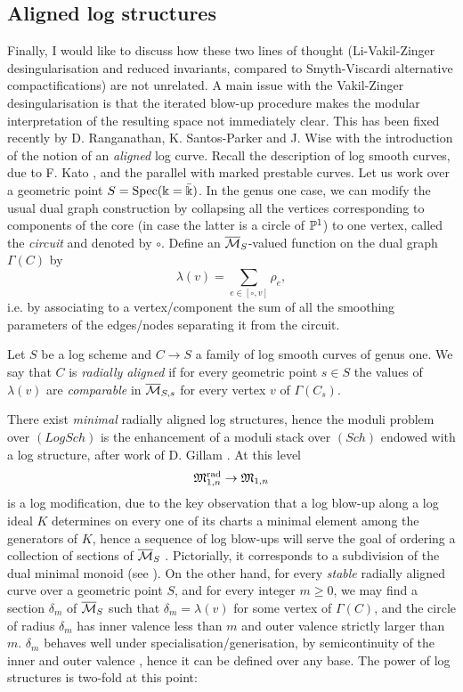 \subsection{Aligned log structures} Finally, I would like to discuss how these two lines of thought (Li-Vakil-Zinger desingularisation and reduced invariants, compared to Smyth-Viscardi alternative compactifications) are not unrelated. A main issue with the Vakil-Zinger desingularisation is that the iterated blow-up procedure makes the modular interpretation of the resulting space not immediately clear. This has been fixed recently by D. Ranganathan, K. Santos-Parker and J. Wise with the introduction of the notion of an \emph{aligned} log curve. Recall the description of log smooth curves, due to F. Kato \cite{KatoF}, and the parallel with marked prestable curves. Let us work over a geometric point $S=\operatorname{Spec}(\Bbbk=\bar{\Bbbk})$. In the genus one case, we can modify the usual dual graph construction by collapsing all the vertices corresponding to components of the core (in case the latter is a circle of $\mathbb P^1$) to one vertex, called the \emph{circuit} and denoted by $\circ$. Define an $\overline{\mathcal{M}}_S$-valued function on the dual graph $\Gamma(C)$ by \[\lambda(v)=\sum_{e\in[\circ,v]}\rho_e,\] i.e. by associating to a vertex/component the sum of all the smoothing parameters of the edges/nodes separating it from the circuit.
\begin{dfn}
 Let $S$ be a log scheme and $C\to S$ a family of log smooth curves of genus one. We say that $C$ is \emph{radially aligned} if for every geometric point $s\in S$ the values of $\lambda(v)$ are \emph{comparable} in $\overline{\mathcal{M}}_{S,s}$ for every vertex $v$ of $\Gamma(C_s)$.
\end{dfn}
There exist \emph{minimal} radially aligned log structures, hence the moduli problem over $(LogSch)$ is the enhancement of a moduli stack over $(Sch)$ endowed with a log structure, after work of D. Gillam \cite{Gillam}. At this level
\[\mathfrak M^{\mathrm{rad}}_{1,n}\rightarrow\mathfrak M_{1,n}\]
is a log modification, due to the key observation that a log blow-up along a log ideal $K$ determines on every one of its charts a minimal element among the generators of $K$, hence a sequence of log blow-ups will serve the goal of ordering a collection of sections of $\overline{\mathcal{M}}_S$ \cite[Lemma 3.36]{Kelithesis}. Pictorially, it corresponds to a subdivision of the dual minimal monoid (see \cite[\S 3.3-3.4]{RSPW}). On the other hand, for every \emph{stable} radially aligned curve over a geometric point $S$, and for every integer $m\geq0$, we may find a section $\delta_m$ of $\overline{\mathcal{M}}_S$ such that $\delta_m=\lambda(v)$ for some vertex of $\Gamma(C)$, and the circle of radius $\delta_m$ has inner valence less than $m$ and outer valence strictly larger than $m$. $\delta_m$ behaves well under specialisation/generisation, by semicontinuity of the inner and outer valence \cite[Proposition 3.5.2]{RSPW}, hence it can be defined over any base. The power of log structures is two-fold at this point:
